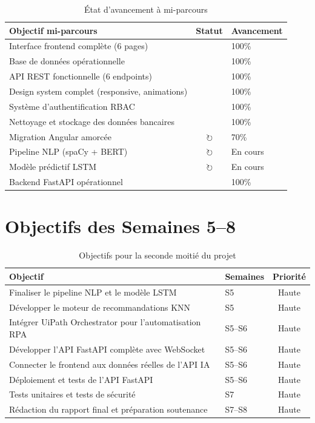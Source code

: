 \documentclass[12pt,a4paper]{report}
\newcommand{\done}{\textcolor{greenCheck}{\ding{51}}}
\newcommand{\inprog}{\textcolor{blueProgress}{$\circlearrowright$}}
\begin{document}
\begin{table}[H]
\centering
\caption{État d'avancement à mi-parcours}
\begin{tabularx}{\textwidth}{|X|c|l|}
\hline
\textbf{Objectif mi-parcours} & \textbf{Statut} & \textbf{Avancement} \\
\hline
Interface frontend complète (6 pages) & \done & 100\% \\
\hline
Base de données opérationnelle & \done & 100\% \\
\hline
API REST fonctionnelle (6 endpoints) & \done & 100\% \\
\hline
Design system complet (responsive, animations) & \done & 100\% \\
\hline
Système d'authentification RBAC & \done & 100\% \\
\hline
Nettoyage et stockage des données bancaires & \done & 100\% \\
\hline
Migration Angular amorcée & \inprog & 70\% \\
\hline
Pipeline NLP (spaCy + BERT) & \inprog & En cours \\
\hline
Modèle prédictif LSTM & \inprog & En cours \\
\hline
Backend FastAPI opérationnel & \done & 100\% \\
\hline
\end{tabularx}
\end{table}

\section{Objectifs des Semaines 5--8}

\begin{table}[H]
\centering
\caption{Objectifs pour la seconde moitié du projet}
\begin{tabularx}{\textwidth}{|X|l|c|}
\hline
\textbf{Objectif} & \textbf{Semaines} & \textbf{Priorité} \\
\hline
Finaliser le pipeline NLP et le modèle LSTM & S5 & Haute \\
\hline
Développer le moteur de recommandations KNN & S5 & Haute \\
\hline
Intégrer UiPath Orchestrator pour l'automatisation RPA & S5--S6 & Haute \\
\hline
Développer l'API FastAPI complète avec WebSocket & S5--S6 & Haute \\
\hline
Connecter le frontend aux données réelles de l'API IA & S5--S6 & Haute \\
\hline
Déploiement et tests de l'API FastAPI & S5--S6 & Haute \\
\hline
Tests unitaires et tests de sécurité & S7 & Haute \\
\hline
Rédaction du rapport final et préparation soutenance & S7--S8 & Haute \\
\hline
\end{tabularx}
\end{table}
\end{document}
